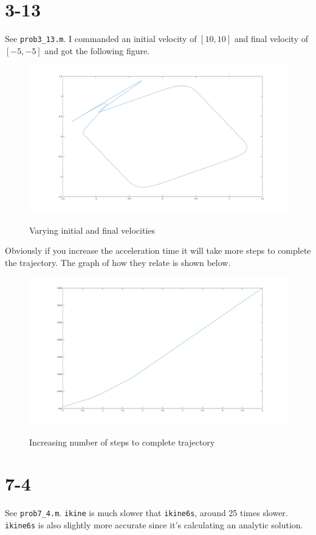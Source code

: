 \documentclass{../homework}
\begin{document}
\begin{parts}[n]
\begin{parts}
       \part{3-13} See \texttt{prob3\_13.m}.  I commanded an initial velocity of $[10, 10]$ and final velocity of $[-5, -5]$ and got the following figure.
       \begin{figure}[H]
            \centering
            \includegraphics[scale=.3]{3_13a.png}
            \label{}
            \caption{Varying initial and final velocities}
       \end{figure}
       Obviously if you increase the acceleration time it will take more steps to complete the trajectory. The graph of how they relate is shown below.
       \begin{figure}[H]
            \centering
            \includegraphics[scale=.3]{3_13b.png}
            \label{}
            \caption{Increasing number of steps to complete trajectory}
       \end{figure}
       \part{7-4} See \texttt{prob7\_4.m}. \texttt{ikine} is much slower that \texttt{ikine6s}, around 25 times slower. \texttt{ikine6s} is also slightly more accurate since it's calculating an analytic solution.
    \end{parts}

\end{parts}
\end{document}
